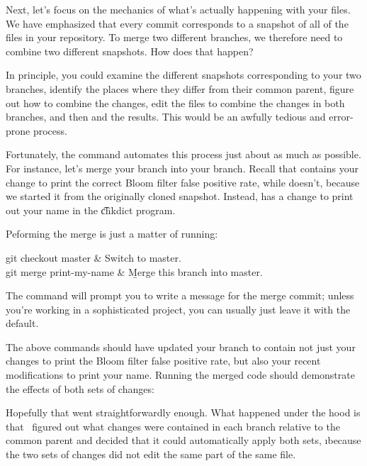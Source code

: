 \documentclass[letterpaper, 12pt, titlepage, twoside]{article}
\begin{document}
Next, let's focus on the mechanics of what's actually happening with your
files. We have emphasized that every commit corresponds to a snapshot of all
of the files in your repository. To merge two different branches, we therefore
need to combine two different snapshots. How does that happen?

In principle, you could examine the different snapshots corresponding to your
two branches, identify the places where they differ from their common parent,
figure out how to combine the changes, edit the files to combine the changes
in both branches, and then  and  the results. This would
be an awfully tedious and error-prone process.

Fortunately, the  command automates this process just about as much
as possible. For instance, let's merge your  branch into your
 branch. Recall that  contains your change to print the
correct Bloom filter false positive rate, while  doesn't,
because we started it from the originally cloned snapshot. Instead,
 has a change to print out your name in the \t{chkdict}
program.

Peforming the merge is just a matter of running:

\begin{typeme}
git checkout master & Switch to master. \\
git merge print-my-name & \b{Merge this branch into master.} \\
\end{typeme}

The  command will prompt you to write a message for the merge
commit; unless you're working in a sophisticated project, you can usually just
leave it with the default.

The above commands should have updated your  branch to contain not
just your changes to print the Bloom filter false positive rate, but also your
recent modifications to print your name. Running the merged code should
demonstrate the effects of both sets of changes:


Hopefully that went straightforwardly enough. What happened under the hood is
that \git\ figured out what changes were contained in each branch relative to
the common parent and decided that it could automatically apply both sets,
\i{because the two sets of changes did not edit the same part of the same
  file}.
\end{document}
